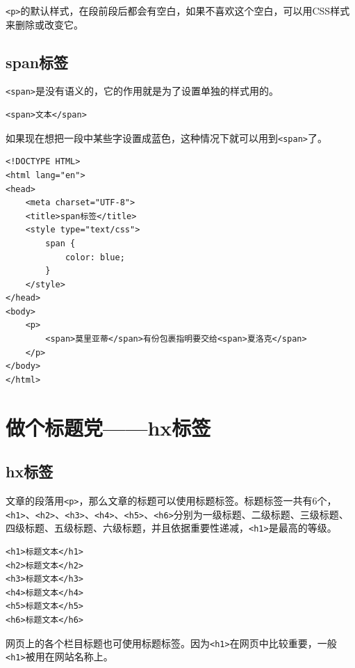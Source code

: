 \lstinline|<p>|的默认样式，在段前段后都会有空白，如果不喜欢这个空白，可以用CSS样式来删除或改变它。

\subsection{span标签}

\lstinline|<span>|是没有语义的，它的作用就是为了设置单独的样式用的。 \\

\begin{lstlisting}[style=htmlcssjs]
<span>文本</span>
\end{lstlisting}

如果现在想把一段中某些字设置成蓝色，这种情况下就可以用到\lstinline|<span>|了。

\begin{lstlisting}[style=htmlcssjs, title=span标签]
<!DOCTYPE HTML>
<html lang="en">
<head>
    <meta charset="UTF-8">
    <title>span标签</title>
    <style type="text/css">
        span {
            color: blue;
        }
    </style>
</head>
<body>
    <p>
        <span>莫里亚蒂</span>有份包裹指明要交给<span>夏洛克</span>
    </p>
</body>
</html>
\end{lstlisting}

\newpage

\section{做个标题党——hx标签}

\subsection{hx标签}

文章的段落用\lstinline|<p>|，那么文章的标题可以使用标题标签。标题标签一共有6个，\lstinline|<h1>|、\lstinline|<h2>|、\lstinline|<h3>|、\lstinline|<h4>|、\lstinline|<h5>|、\lstinline|<h6>|分别为一级标题、二级标题、三级标题、四级标题、五级标题、六级标题，并且依据重要性递减，\lstinline|<h1>|是最高的等级。 \\

\begin{lstlisting}[style=htmlcssjs]
<h1>标题文本</h1>
<h2>标题文本</h2>
<h3>标题文本</h3>
<h4>标题文本</h4>
<h5>标题文本</h5>
<h6>标题文本</h6>
\end{lstlisting}

网页上的各个栏目标题也可使用标题标签。因为\lstinline|<h1>|在网页中比较重要，一般\lstinline|<h1>|被用在网站名称上。 \\


